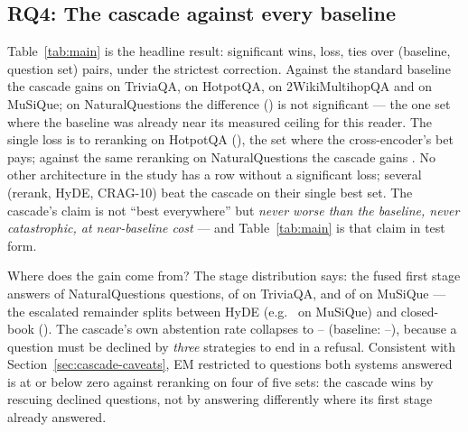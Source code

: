 \subsection{RQ4: The cascade against every baseline}
\label{sec:results-main}

\begin{table}[t]
\centering\small
\caption{The proposed cascade against every baseline on every question
set. Each cell is the paired Exact Match difference (cascade minus
baseline); \textbf{bold} marks a significant cascade win and
\underline{underline} a significant loss under McNemar's test with Holm
adjustment over all \ResultPairs{} cells jointly. The cascade wins
\ResultWins{}, loses \ResultLosses{}, ties \ResultTies{}.}
\label{tab:main}
\ResultTable
\end{table}

Table~\ref{tab:main} is the headline result: \ResultWins{} significant
wins, \ResultLosses{} loss, \ResultTies{} ties over \ResultPairs{}
(baseline, question set) pairs, under the strictest correction. Against
the standard baseline the cascade gains
\NaiveVsCascadeTriviaQAExactMatchDiff{} on TriviaQA,
\NaiveVsCascadeHotpotQAExactMatchDiff{} on HotpotQA,
\NaiveVsCascadeTwoWikiExactMatchDiff{} on 2WikiMultihopQA and
\NaiveVsCascadeMuSiQueExactMatchDiff{} on MuSiQue; on NaturalQuestions the
difference (\NaiveVsCascadeNQExactMatchDiff) is not significant --- the
one set where the baseline was already near its measured ceiling for this
reader. The single loss is to reranking on HotpotQA
(\RerankVsCascadeHotpotQAExactMatchDiff), the set where the
cross-encoder's bet pays; against the same reranking on NaturalQuestions
the cascade gains \RerankVsCascadeNQExactMatchDiff. No other architecture
in the study has a row without a significant loss; several
(rerank, HyDE, CRAG-10) beat the cascade on their single best set. The
cascade's claim is not ``best everywhere'' but \emph{never worse than the
baseline, never catastrophic, at near-baseline cost} --- and
Table~\ref{tab:main} is that claim in test form.

Where does the gain come from? The stage distribution says: the fused
first stage answers \CascadeNQStageFused{} of \CascadeNQQuestions{}
NaturalQuestions questions, \CascadeTriviaQAStageFused{} of
\CascadeTriviaQAQuestions{} on TriviaQA, and
\CascadeMuSiQueStageFused{} of \CascadeMuSiQueQuestions{} on MuSiQue ---
the escalated remainder splits between HyDE
(e.g.\ \CascadeMuSiQueStageHyde{} on MuSiQue) and closed-book
(\CascadeMuSiQueStageClosedbook). The cascade's own abstention rate
collapses to \CascadeTriviaQAAbstentionRate--\CascadeMuSiQueAbstentionRate{}
(baseline: \NaiveRAGTriviaQAAbstentionRate--\NaiveRAGMuSiQueAbstentionRate),
because a question must be declined by \emph{three} strategies to end in a
refusal. Consistent with Section~\ref{sec:cascade-caveats}, EM restricted
to questions both systems answered is at or below zero against reranking
on four of five sets: the cascade wins by rescuing declined questions,
not by answering differently where its first stage already answered.

